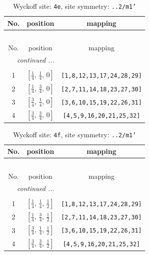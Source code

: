 \documentclass[fleqn,8pt]{jsarticle}
\begin{document}
\begin{longtable}{ccc}
\caption{Wyckoff site: {\tt 4e}, site symmetry: {\tt ..2/m1'}}
 \\
 \hline \hline
No. & position & mapping \\ \hline \endfirsthead

\multicolumn{2}{l}{\tablename\ \thetable{}} \\
 \hline \hline
No. & position & mapping \\ \hline \endhead

 \hline \hline
\multicolumn{2}{r}{\footnotesize\it continued ...} \\ \endfoot

 \hline \hline
\multicolumn{2}{r}{} \\ \endlastfoot

1 & $\left[ \frac{1}{4},\, \frac{1}{4},\, 0 \right]$ & {\tt [1,8,12,13,17,24,28,29]} \\ \hline
2 & $\left[ \frac{1}{4},\, \frac{3}{4},\, 0 \right]$ & {\tt [2,7,11,14,18,23,27,30]} \\ \hline
3 & $\left[ \frac{3}{4},\, \frac{1}{4},\, 0 \right]$ & {\tt [3,6,10,15,19,22,26,31]} \\ \hline
4 & $\left[ \frac{3}{4},\, \frac{3}{4},\, 0 \right]$ & {\tt [4,5,9,16,20,21,25,32]} \\
\end{longtable}
\renewcommand{\arraystretch}{1.2}
\begin{longtable}{ccc}
\caption{Wyckoff site: {\tt 4f}, site symmetry: {\tt ..2/m1'}}
 \\
 \hline \hline
No. & position & mapping \\ \hline \endfirsthead

\multicolumn{2}{l}{\tablename\ \thetable{}} \\
 \hline \hline
No. & position & mapping \\ \hline \endhead

 \hline \hline
\multicolumn{2}{r}{\footnotesize\it continued ...} \\ \endfoot

 \hline \hline
\multicolumn{2}{r}{} \\ \endlastfoot

1 & $\left[ \frac{1}{4},\, \frac{1}{4},\, \frac{1}{2} \right]$ & {\tt [1,8,12,13,17,24,28,29]} \\ \hline
2 & $\left[ \frac{1}{4},\, \frac{3}{4},\, \frac{1}{2} \right]$ & {\tt [2,7,11,14,18,23,27,30]} \\ \hline
3 & $\left[ \frac{3}{4},\, \frac{1}{4},\, \frac{1}{2} \right]$ & {\tt [3,6,10,15,19,22,26,31]} \\ \hline
4 & $\left[ \frac{3}{4},\, \frac{3}{4},\, \frac{1}{2} \right]$ & {\tt [4,5,9,16,20,21,25,32]} \\
\end{longtable}
\end{document}
